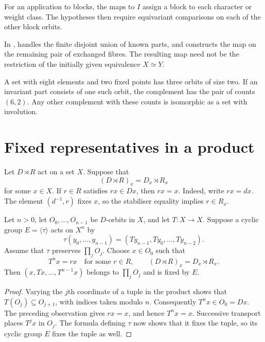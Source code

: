 For an application to blocks, the maps to $I$ assign a block to each
character or weight class. The hypotheses then require equivariant
comparisons on each of the other block orbits.

\begin{implementation}
In ,
 handles the finite
disjoint union of known parts, and
 constructs the map on
the remaining pair of exchanged fibres. The resulting map need not
be the restriction of the initially given equivalence $X\simeq Y$.
\end{implementation}

\begin{example}
A set with eight elements and two fixed points has three orbits of size
two. If an invariant part consists of one such orbit, the complement has
the pair of counts $(6,2)$. Any other complement with these counts is
isomorphic as a set with involution.
\end{example}

\section{Fixed representatives in a product}

Let $D\rtimes R$ act on a set $X$. Suppose that
\[
 (D\rtimes R)_x=D_x\rtimes R_x
\]
for some $x\in X$. If $r\in R$ satisfies $rx\in Dx$, then $rx=x$.
Indeed, write $rx=dx$. The element $(d^{-1},r)$ fixes $x$, so the
stabiliser equality implies $r\in R_x$.

\begin{proposition}
Let $n>0$, let $O_0,\ldots,O_{n-1}$ be $D$-orbits in $X$, and let
$T:X\to X$. Suppose a cyclic group $E=\langle\tau\rangle$ acts on
$X^n$ by
\[
 \tau(y_0,\ldots,y_{n-1})=(Ty_{n-1},Ty_0,\ldots,Ty_{n-2}).
\]
Assume that $\tau$ preserves $\prod_jO_j$. Choose $x\in O_0$ such
that
\[
 T^n x=rx\quad\text{for some }r\in R,
 \qquad (D\rtimes R)_x=D_x\rtimes R_x.
\]
Then $(x,Tx,\ldots,T^{n-1}x)$ belongs to $\prod_jO_j$ and is fixed
by $E$.
\end{proposition}
\begin{proof}
Varying the $j$th coordinate of a tuple in the product shows that
$T(O_j)\subseteq O_{j+1}$, with indices taken modulo $n$.
Consequently $T^n x\in O_0=Dx$. The preceding observation gives
$rx=x$, and hence $T^n x=x$.
Successive transport places $T^jx$ in $O_j$.
The formula defining $\tau$ now shows that it fixes the tuple,
so its cyclic group $E$ fixes the tuple as well.
\end{proof}

